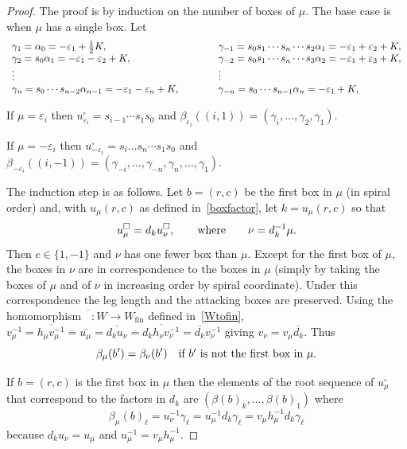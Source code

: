 \documentclass[11pt]{article}
\theoremstyle{plain}
\theoremstyle{definition}
\theoremstyle{remark}
\numberwithin{equation}{section}
\newcounter{r}
\newcounter{s}
\begin{document}
\begin{proof}
The proof is by induction on the number of boxes of $\mu$.
The base case is when $\mu$ has a single box.   Let
\begin{align*}
\begin{array}{lcl}
\gamma_1 =\alpha_0 = -\varepsilon_1+\hbox{$\frac12$}K, 
& \qquad &
\gamma_{-1} = s_0s_1\cdots s_n\cdots s_2\alpha_1 = -\varepsilon_1+\varepsilon_2+K, \\
\gamma_2 =s_0\alpha_1 = -\varepsilon_1-\varepsilon_2+K, 
& & 
\gamma_{-2} = s_0s_1\cdots s_n\cdots s_3\alpha_2 = -\varepsilon_1+\varepsilon_3+K, \\
\vdots & & \vdots \\
\gamma_n = s_0\cdots s_{n-2}\alpha_{n-1}= -\varepsilon_1-\varepsilon_n+K, 
& & 
\gamma_{-n} = s_0\cdots s_{n-1}\alpha_n = -\varepsilon_1+K, 
\end{array}
\end{align*}

\smallskip\noindent
If $\mu = \varepsilon_i$ then $u_{\varepsilon_i}^\square = s_{i-1}\cdots s_1s_0$ and 
$\beta_{\varepsilon_i}((i,1)) = ( \gamma_i, \ldots, \gamma_2, \gamma_1)$.

\smallskip\noindent
If $\mu = -\varepsilon_i$ then $u_{-\varepsilon_i}^\square = s_i\ldots s_n \cdots s_1s_0$ and
$\beta_{-\varepsilon_i}((i,-1)) = ( \gamma_{-i}, \ldots, \gamma_{-n}, \gamma_n, \ldots, \gamma_1)$.

The induction step is as follows.  Let $b=(r,c)$ be the first box in $\mu$ (in spiral order) and, 
with $u_\mu(r,c)$ as defined in~\eqref{boxfactor},  let $k=u_\mu(r,c)$ so that
$$u_\mu^\square = d_k u_\nu^\square,
\qquad\hbox{where}\qquad \nu = d_k^{-1}\mu.
$$
Then $c\in \{1,-1\}$ and $\nu$ has one fewer box than $\mu$.  Except for the first box of $\mu$,
the boxes in $\nu$ are in correspondence to the boxes in $\mu$ (simply by taking the boxes of $\mu$ and
of $\nu$ in increasing order by spiral coordinate).
Under this correspondence the leg length and the attacking boxes are preserved.
Using the homomorphism $\overline{\phantom{T}}\colon W \longrightarrow  W_{\mathrm{fin}}$ defined in~\eqref{Wtofin},
$v_\mu^{-1} = \overline{h_\mu v_\mu^{-1}} = \overline{u_\mu} = \overline{d_ku_\nu} = \overline{d_k h_\nu v_\nu^{-1}} 
= \overline{d_k}v_\nu^{-1}$
giving
$v_\nu = v_\mu \overline{d_k}$.
Thus
$$\beta_\mu(b') = \beta_\nu(b')\quad \hbox{if $b'$ is not the first box in $\mu$.}
$$

If $b=(r,c)$ is the first box in $\mu$ then the elements of the root sequence of $u_\mu^\square$ that correspond to the
factors in $d_k$ are $(\beta(b)_k, \ldots, \beta(b)_1)$ where
$$\beta_\mu(b)_\ell =u_\nu^{-1} \gamma_\ell = u_\mu^{-1}d_k\gamma_\ell
= v_\mu h_\mu^{-1}d_k \gamma_\ell
$$
because $d_{k}u_{\nu} = u_{\mu}$ and 
$u_\mu^{-1} = v_\mu h_\mu^{-1}$. 


\end{proof}
\end{document}
